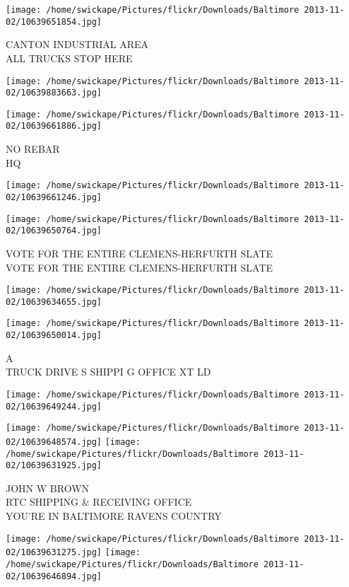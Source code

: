 \documentclass[10pt,letterpaper]{article}
\begin{document}
\vspace{0.25in}
\texttt{[image: /home/swickape/Pictures/flickr/Downloads/Baltimore 2013-11-02/10639651854.jpg]}

CANTON INDUSTRIAL AREA\\
ALL TRUCKS STOP HERE
\pagebreak

\texttt{[image: /home/swickape/Pictures/flickr/Downloads/Baltimore 2013-11-02/10639883663.jpg]}

\vspace{0.25in}
\texttt{[image: /home/swickape/Pictures/flickr/Downloads/Baltimore 2013-11-02/10639661886.jpg]}

NO REBAR\\
HQ
\pagebreak

\texttt{[image: /home/swickape/Pictures/flickr/Downloads/Baltimore 2013-11-02/10639661246.jpg]}

\vspace{0.25in}
\texttt{[image: /home/swickape/Pictures/flickr/Downloads/Baltimore 2013-11-02/10639650764.jpg]}

VOTE FOR THE ENTIRE CLEMENS{-}HERFURTH SLATE\\
VOTE FOR THE ENTIRE CLEMENS{-}HERFURTH SLATE
\pagebreak

\texttt{[image: /home/swickape/Pictures/flickr/Downloads/Baltimore 2013-11-02/10639634655.jpg]}

\vspace{0.25in}
\texttt{[image: /home/swickape/Pictures/flickr/Downloads/Baltimore 2013-11-02/10639650014.jpg]}

A\\
TRUCK DRIVE S SHIPPI G OFFICE XT LD
\pagebreak

\texttt{[image: /home/swickape/Pictures/flickr/Downloads/Baltimore 2013-11-02/10639649244.jpg]}

\vspace{0.25in}
\texttt{[image: /home/swickape/Pictures/flickr/Downloads/Baltimore 2013-11-02/10639648574.jpg]}
\texttt{[image: /home/swickape/Pictures/flickr/Downloads/Baltimore 2013-11-02/10639631925.jpg]}

JOHN W BROWN\\
RTC SHIPPING \& RECEIVING OFFICE\\
YOU'RE IN BALTIMORE RAVENS COUNTRY
\pagebreak

\texttt{[image: /home/swickape/Pictures/flickr/Downloads/Baltimore 2013-11-02/10639631275.jpg]}
\texttt{[image: /home/swickape/Pictures/flickr/Downloads/Baltimore 2013-11-02/10639646894.jpg]}
\end{document}
